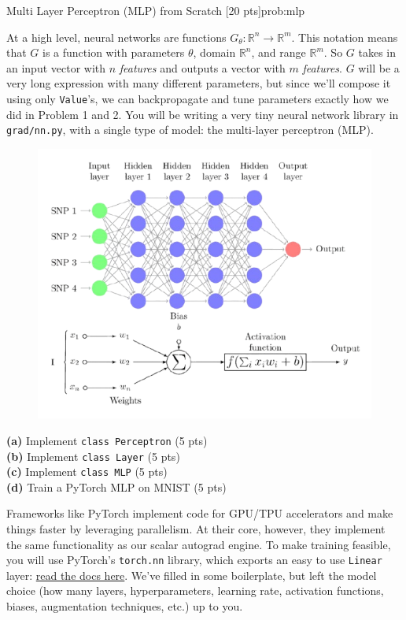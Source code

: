 \newpage{}
\begin{problem}{Multi Layer Perceptron (MLP) from Scratch \hfill {[20 pts]}}{prob:mlp}

At a high level, neural networks are functions $G_\theta: \mathbb{R}^n \rightarrow \mathbb{R}^m$. This notation means that $G$ is a function with parameters $\theta$, domain $\mathbb{R}^n$, and range $\mathbb{R}^m$. So $G$ takes in an input vector with $n$ \textit{features} and outputs a vector with $m$ \textit{features}. $G$ will be a very long expression with many different parameters, but since we'll compose it using only \verb|Value|'s, we can backpropagate and tune parameters exactly how we did in Problem 1 and 2. You will be writing a very tiny neural network library in \verb|grad/nn.py|, with a single type of model: the multi-layer perceptron (MLP). \\

\begin{figure}[H]
    \centering
    \includegraphics[width=0.75\linewidth]{media/mlp.png}
    \caption{}
    \label{fig:mlp}
\end{figure}

\vspace{10px}

\begin{adjustwidth}{2em}{2em}
    \textbf{(a)} Implement \verb|class Perceptron| \hfill (5 pts)\\
    \textbf{(b)} Implement \verb|class Layer| \hfill (5 pts)\\
    \textbf{(c)} Implement \verb|class MLP| \hfill (5 pts)\\
    \textbf{(d)} Train a PyTorch MLP on MNIST \hfill (5 pts)\\
    \begin{adjustwidth}{2em}{2em}
        \small
        Frameworks like PyTorch implement code for GPU/TPU accelerators 
        and make things faster by leveraging parallelism. At their core, however, they implement the same functionality as our scalar autograd engine. To make training feasible, you will use PyTorch's \verb|torch.nn| library, which exports an easy to use \verb|Linear| layer: \href{https://pytorch.org/docs/stable/generated/torch.nn.Linear.html}{read the docs here}. We've filled in some boilerplate, but left the model choice (how many layers, hyperparameters, learning rate, activation functions, biases, augmentation techniques, etc.) up to you.\\


\end{adjustwidth}
\end{adjustwidth}
\end{problem}
